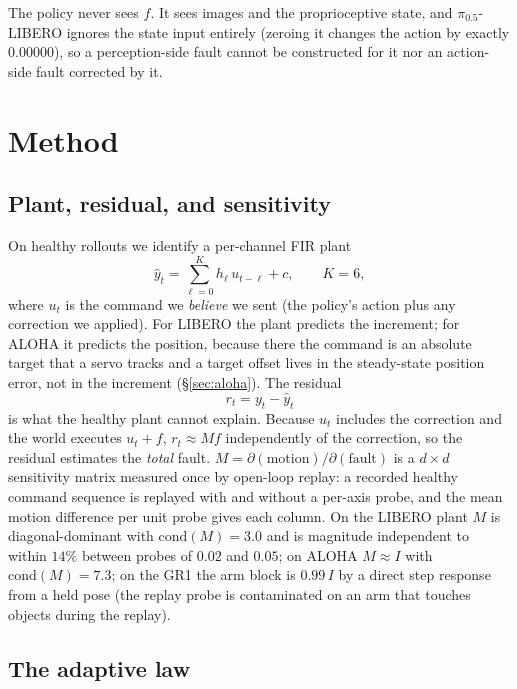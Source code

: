 \documentclass{article}
\begin{document}
The policy never sees $f$. It sees images and the proprioceptive state, and $\pi_{0.5}$-LIBERO
ignores the state input entirely (zeroing it changes the action by exactly $0.00000$), so a
perception-side fault cannot be constructed for it nor an action-side fault corrected by it.

\section{Method}
\label{sec:method}

\subsection{Plant, residual, and sensitivity}

On healthy rollouts we identify a per-channel FIR plant
\begin{equation}
\hat y_t = \sum_{\ell=0}^{K} h_\ell\, u_{t-\ell} + c, \qquad K = 6,
\end{equation}
where $u_t$ is the command we \emph{believe} we sent (the policy's action plus any
correction we applied). For LIBERO the plant predicts the increment; for ALOHA it predicts
the position, because there the command is an absolute target that a servo tracks and a
target offset lives in the steady-state position error, not in the increment
(\S\ref{sec:aloha}). The residual
\begin{equation}
r_t = y_t - \hat y_t
\end{equation}
is what the healthy plant cannot explain. Because $u_t$ includes the correction and the
world executes $u_t + f$, $r_t \approx M f$ independently of the correction, so the residual
estimates the \emph{total} fault. $M = \partial(\text{motion})/\partial(\text{fault})$ is a
$d\times d$ sensitivity matrix measured once by open-loop replay: a recorded healthy command
sequence is replayed with and without a per-axis probe, and the mean motion difference per
unit probe gives each column. On the LIBERO plant $M$ is diagonal-dominant with
$\mathrm{cond}(M)=3.0$ and is magnitude independent to within $14\%$ between probes of
$0.02$ and $0.05$; on ALOHA $M\approx I$ with $\mathrm{cond}(M)=7.3$; on the GR1 the
arm block is $0.99\,I$ by a direct step response from a held pose (the replay probe is
contaminated on an arm that touches objects during the replay).

\subsection{The adaptive law}
\label{sec:law}
\end{document}
